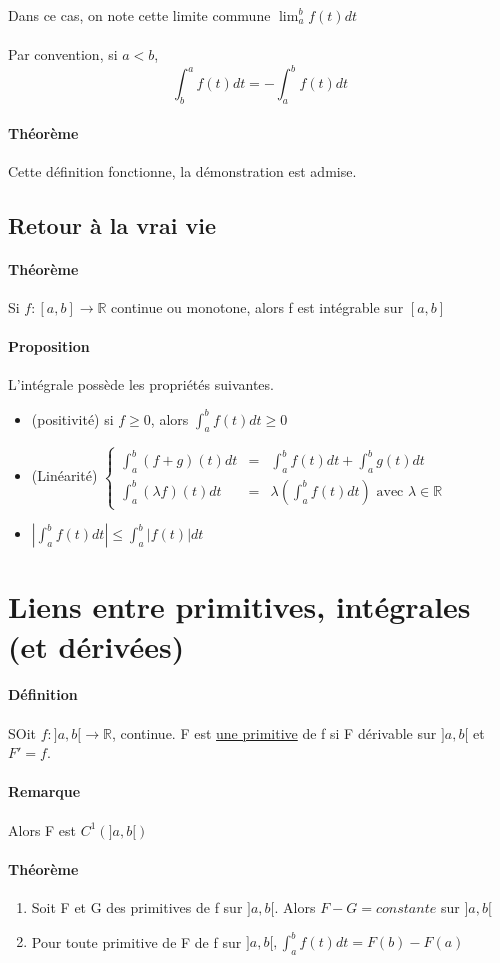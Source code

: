 	Dans ce cas, on note cette limite commune $\lim_a^b f(t) dt$ ~\\ ~\\
	Par convention, si $a < b$, \[
	\int_b^a f(t)dt = -\int_a^b f(t) dt\]

	\paragraph{Théorème} Cette définition fonctionne, la démonstration est admise.

	\subsection{Retour à la vrai vie}

	\paragraph{Théorème} Si $f:[a, b] \rightarrow \mathbb{R}$ continue ou monotone, alors f est intégrable sur $[a, b]$
	\paragraph{Proposition} L'intégrale possède les propriétés suivantes.
	\begin{itemize}
		\item (positivité) si $f \geq 0$, alors $\int_a^b f(t)dt \geq 0$
		\item (Linéarité) $\left\{ \begin{array}{rcl}
					\int_a^b (f+g)(t) dt &=& \int_a^b f(t) dt + \int_a^b g(t) dt \\
				\int_a^b (\lambda f)(t) dt &=& \lambda (\int_a^b f(t)dt) \text{ avec } \lambda \in \mathbb{R}\end{array}\right.$
		\item $|\int_a^b f(t)dt| \leq \int_a^b |f(t)|dt$
	\end{itemize}

	\section{Liens entre primitives, intégrales (et dérivées)}

\paragraph{Définition} SOit $f:]a, b[ \rightarrow \mathbb{R}$, continue.
F est \ul{une primitive} de f si F dérivable sur $]a, b[$ et $F'=f$. 
\paragraph{Remarque} Alors F est $C^1(]a, b[)$

\paragraph{Théorème} \begin{enumerate}
\item Soit F et G des primitives de f sur $]a, b[$. Alors $F - G = constante$ sur $]a, b[$
\item Pour toute primitive de F de f sur $]a, b[, \int_a^b f(t)dt = F(b) - F(a)$
\end{enumerate}
